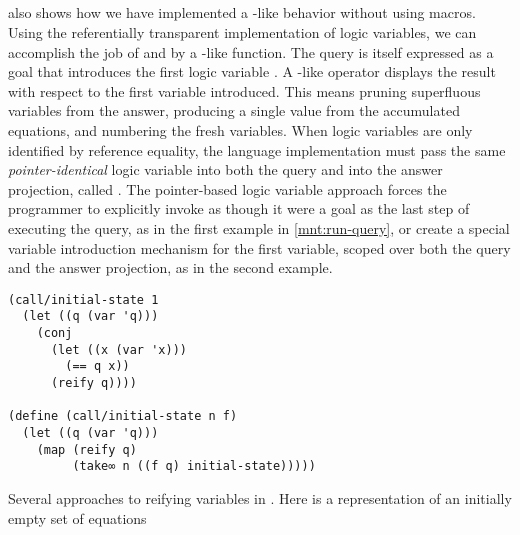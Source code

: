 \documentclass[sigplan,balance=true,pbalance=true,natbib=false]{acmart}
\begin{document}
\subsection{}

 also shows how we have
implemented a -like behavior without using macros.
Using the referentially transparent implementation of logic variables,
we can accomplish the job of  and  by
a -like function. The query is itself
expressed as a goal that introduces the first logic variable
. A -like operator displays the result
with respect to the first variable introduced. This means pruning
superfluous variables from the answer, producing a single value from
the accumulated equations, and numbering the fresh variables. When
logic variables are only identified by reference equality, the
language implementation must pass the same \emph{pointer-identical}
logic variable into both the query and into the answer projection,
called . The pointer-based logic variable approach
forces the programmer to explicitly invoke  as
though it were a goal as the last step of executing the query, as in
the first example in \cref{mnt:run-query}, or create a special
variable introduction mechanism for the first variable, scoped over
both the query and the answer projection, as in the second example.

\begin{listing}[h]
  \begin{verbatim}
(call/initial-state 1
  (let ((q (var 'q)))
    (conj
      (let ((x (var 'x)))
        (== q x))
      (reify q))))

(define (call/initial-state n f)
  (let ((q (var 'q)))
    (map (reify q)
         (take∞ n ((f q) initial-state)))))
  \end{verbatim}
  \caption{Several approaches to reifying variables in . Here  is a representation of an initially empty set of equations}\label{mnt:run-query}
\end{listing}



\subsection{}
\end{document}
